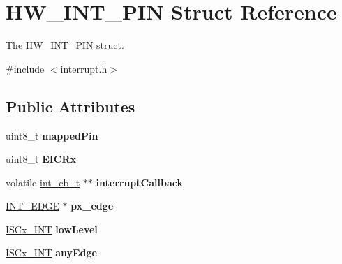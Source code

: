 \hypertarget{structHW__INT__PIN}{}\section{H\+W\+\_\+\+I\+N\+T\+\_\+\+P\+IN Struct Reference}
\label{structHW__INT__PIN}


The \hyperlink{structHW__INT__PIN}{H\+W\+\_\+\+I\+N\+T\+\_\+\+P\+IN} struct.  




{\ttfamily \#include $<$interrupt.\+h$>$}

\subsection*{Public Attributes}
\begin{DoxyCompactItemize}
\item 
\mbox{\label{structHW__INT__PIN_a69d9ddba3cc41c69082271c88e3b9620}} 
uint8\+\_\+t {\bfseries mapped\+Pin}
\item 
\mbox{\label{structHW__INT__PIN_a9f324c3632281053376de195c8a4401a}} 
uint8\+\_\+t {\bfseries E\+I\+C\+Rx}
\item 
\mbox{\label{structHW__INT__PIN_a553e9442be5f738b892a8d065b274313}} 
volatile \hyperlink{interrupt_8h_af3e04027ddcd2e23670a55888d788d13}{int\+\_\+cb\+\_\+t} $\ast$$\ast$ {\bfseries interrupt\+Callback}
\item 
\mbox{\label{structHW__INT__PIN_aeca115b23cb1b3a6130444eb6de309b6}} 
\hyperlink{interrupt_8h_affe9baf0034f4cbb8aec6ed2c42b1676}{I\+N\+T\+\_\+\+E\+D\+GE} $\ast$ {\bfseries px\+\_\+edge}
\item 
\mbox{\label{structHW__INT__PIN_ad2a69e2c92f937cfde12c0eaca5d41c2}} 
\hyperlink{interrupt_8h_a7e03a41431c7de6b2b1af4cb96b7e2b2}{I\+S\+Cx\+\_\+\+I\+NT} {\bfseries low\+Level}
\item 
\mbox{\label{structHW__INT__PIN_a9527056267580f8c3698107c0f5bf9f7}} 
\hyperlink{interrupt_8h_a7e03a41431c7de6b2b1af4cb96b7e2b2}{I\+S\+Cx\+\_\+\+I\+NT} {\bfseries any\+Edge}
\item 
\mbox{\label{structHW__INT__PIN_a5dce3e9352d00bd55cb9f87de720b2f5}} 
$$
\end{DoxyCompactItemize}
